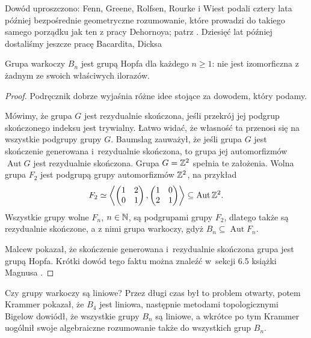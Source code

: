 Dowód uproszczono: Fenn, Greene, Rolfsen, Rourke i Wiest podali cztery lata później bezpośrednie geometryczne rozumowanie, które prowadzi do takiego samego porządku jak ten z pracy Dehornoya; patrz \cite{fenn99}.
%
%
%
%
%
Dziesięć lat później dostaliśmy jeszcze pracę Bacardita, Dicksa \cite{bacardit09}
%
%

\begin{proposition}
    Grupa warkoczy $B_n$ jest grupą Hopfa dla każdego $n \ge 1$: nie jest izomorficzna z żadnym ze swoich właściwych ilorazów.
\end{proposition}

\begin{proof}
%
%
    Podręcznik \cite{magnus66} dobrze wyjaśnia różne idee stojące za dowodem, który podamy.

    Mówimy, że grupa $G$ jest rezydualnie skończona, jeśli przekrój jej podgrup skończonego indeksu jest trywialny.
    Łatwo widać, że własność ta przenosi się na wszystkie podgrupy grupy $G$.
    Baumslag zauważył, że jeśli grupa $G$ jest skończenie generowana i~rezydualnie skończona, to grupa jej automorfizmów $\operatorname{Aut} G$ jest rezydualnie skończona.
    Grupa $G = \mathbb Z^2$ spełnia te założenia.
    Wolna grupa $F_2$ jest podgrupą grupy automorfizmów $\mathbb Z^2$, na przykład
    \begin{equation}
        F_2 \simeq \left\langle
        \begin{pmatrix}
            1 & 2 \\
            0 & 1
        \end{pmatrix},
        \begin{pmatrix}
            1 & 0 \\
            2 & 1
        \end{pmatrix}
        \right\rangle \subseteq \operatorname{Aut} \mathbb Z^2.
    \end{equation}
    Wszystkie grupy wolne $F_n$, $n \in \mathbb N$, są podgrupami grupy $F_2$, dlatego także są rezydualnie skończone, a z nimi grupa warkoczy, gdyż $B_n \subseteq \operatorname{Aut} F_n$.

    Malcew pokazał, że skończenie generowana i~rezydualnie skończona grupa jest grupą Hopfa.
    Krótki dowód tego faktu można znaleźć w~sekcji 6.5 książki Magnusa \cite{magnus66}.
\end{proof}

Czy grupy warkoczy są liniowe?
Przez długi czas był to problem otwarty, potem Krammer \cite{krammer00} pokazał, że $B_4$ jest liniowa, następnie metodami topologicznymi Bigelow \cite{bigelow01} dowiódł, że wszystkie grupy $B_n$ są liniowe, a wkrótce po tym Krammer \cite{krammer02} uogólnił swoje algebraiczne rozumowanie także do wszystkich grup $B_n$.
%
%





